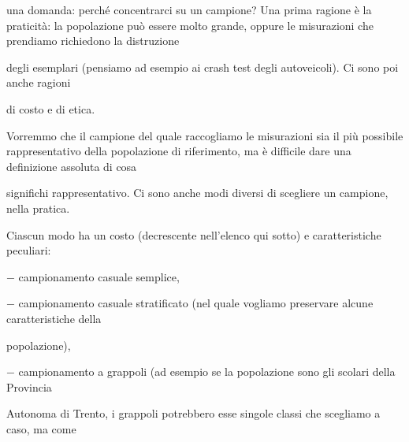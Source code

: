 \documentclass[a4paper,portrait,12pt]{article}
\begin{document}
\begin{flushleft}
una domanda: perch\'{e} concentrarci su un campione? Una prima ragione \`{e} la praticit\`{a}: la popolazione pu\`{o} essere molto grande, oppure le misurazioni che prendiamo richiedono la distruzione
\end{flushleft}


\begin{flushleft}
degli esemplari (pensiamo ad esempio ai crash test degli autoveicoli). Ci sono poi anche ragioni
\end{flushleft}


\begin{flushleft}
di costo e di etica.
\end{flushleft}


\begin{flushleft}
Vorremmo che il campione del quale raccogliamo le misurazioni sia il più possibile rappresentativo della popolazione di riferimento, ma \`{e} difficile dare una definizione assoluta di cosa
\end{flushleft}


\begin{flushleft}
significhi rappresentativo. Ci sono anche modi diversi di scegliere un campione, nella pratica.
\end{flushleft}


\begin{flushleft}
Ciascun modo ha un costo (decrescente nell'elenco qui sotto) e caratteristiche peculiari:
\end{flushleft}


\begin{flushleft}
$-$ campionamento casuale semplice,
\end{flushleft}


\begin{flushleft}
$-$ campionamento casuale stratificato (nel quale vogliamo preservare alcune caratteristiche della
\end{flushleft}


\begin{flushleft}
popolazione),
\end{flushleft}


\begin{flushleft}
$-$ campionamento a grappoli (ad esempio se la popolazione sono gli scolari della Provincia
\end{flushleft}


\begin{flushleft}
Autonoma di Trento, i grappoli potrebbero esse singole classi che scegliamo a caso, ma come
\end{flushleft}
\end{document}

